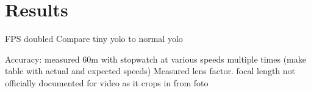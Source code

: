 
\chapter{Results} \label{cha:Results}

FPS doubled
Compare tiny yolo to normal yolo

Accuracy:
measured 60m with stopwatch at various speeds multiple times (make table with actual and expected speeds)
Measured lens factor. focal length not officially documented for video as it crops in from foto

